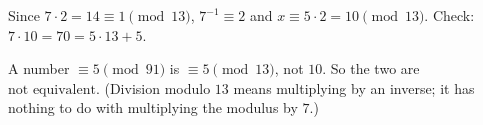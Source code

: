 Since $7\cdot2=14\equiv1\pmod{13}$, $7^{-1}\equiv2$ and $x\equiv5\cdot2=10\pmod{13}$. Check: $7\cdot10=70=5\cdot13+5$.

A number $\equiv5\pmod{91}$ is $\equiv5\pmod{13}$, not $10$. So the two are $\boxed{\text{not equivalent}}$. (Division modulo $13$ means multiplying by an inverse; it has nothing to do with multiplying the modulus by $7$.)
